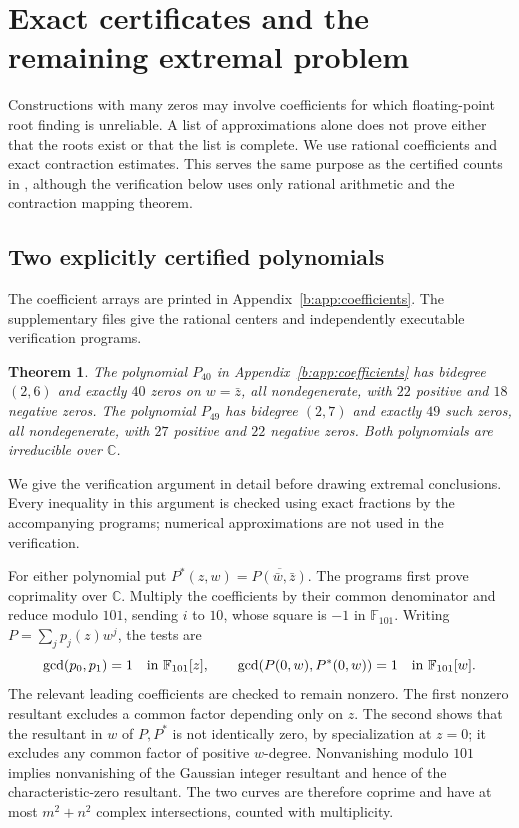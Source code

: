 \documentclass[UTF8,11pt]{ctexart}
\newtheorem{thm}{Theorem}[section]
\theoremstyle{definition}
\numberwithin{equation}{section}
\newcommand{\C}{\mathbb C}\newcommand{\R}{\mathbb R}
\begin{document}
\section{Exact certificates and the remaining extremal problem}\label{b:sec:certificates}

Constructions with many zeros may involve coefficients for which
floating-point root finding is unreliable. A list of approximations
alone does not prove either that the roots exist or that the list is
complete. We use rational coefficients and exact contraction estimates.
This serves the same purpose as the certified counts in
\cite[Section~1.3, \av, p.~3]{HLLM15}, although the verification
below uses only rational arithmetic and the contraction mapping theorem.

\subsection{Two explicitly certified polynomials}
The coefficient arrays are printed in Appendix~\ref{b:app:coefficients}.
The supplementary files give the rational centers and independently
executable verification programs.
\begin{thm}\label{b:thm:certified}
The polynomial $P_{40}$ in Appendix~\ref{b:app:coefficients} has
bidegree $(2,6)$ and exactly $40$ zeros on $w=\bar z$, all
nondegenerate, with $22$ positive and $18$ negative zeros.
The polynomial $P_{49}$ has bidegree $(2,7)$ and exactly $49$ such
zeros, all nondegenerate, with $27$ positive and $22$ negative zeros.
Both polynomials are irreducible over $\C$.
\end{thm}

We give the verification argument in detail before drawing extremal
conclusions. Every inequality in this argument is checked using exact
fractions by the accompanying programs; numerical approximations are
not used in the verification.

For either polynomial put $P^*(z,w)=\overline{P(\bar w,\bar z)}$.
The programs first prove coprimality over $\C$. Multiply the
coefficients by their common denominator and reduce modulo $101$,
sending $i$ to $10$, whose square is $-1$ in $\mathbb F_{101}$.
Writing $P=\sum_j p_j(z)w^j$, the tests are
\[
 \gcd(p_0,p_1)=1\quad\hbox{in }\mathbb F_{101}[z],
 \qquad
 \gcd(P(0,w),P^*(0,w))=1\quad\hbox{in }\mathbb F_{101}[w].
\]
The relevant leading coefficients are checked to remain nonzero.
The first nonzero resultant excludes a common factor depending only
on $z$. The second shows that the resultant in $w$ of $P,P^*$
is not identically zero, by specialization at $z=0$; it excludes
any common factor of positive $w$-degree. Nonvanishing modulo $101$
implies nonvanishing of the Gaussian integer resultant and hence of
the characteristic-zero resultant. The two curves are therefore
coprime and have at most $m^2+n^2$ complex intersections, counted
with multiplicity.
\end{document}
